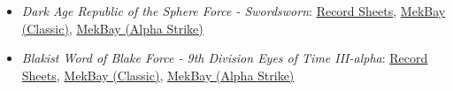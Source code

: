 \begin{itemize}
\item \emph{Dark Age Republic of the Sphere Force - Swordsworn}: \href{https://raw.githubusercontent.com/Eudicods/outworlds-wastes/rules-pdf/swordsworn.pdf}{Record Sheets}, \href{https://mekbay.com/?units=Outworlds%20Wastes~BMAtlasIII_AS7D3,BMHatchetman_HCT5DD,IMHeavyLifter_HCL1MCargoMechMOD:5:5,IMHarvester_HVR199MAAgroMechMOD:5:5,IMBurrower_DTM1MMiningMechMOD:5:5,CVTribuneMobileTacticalCommandHQ:5:5,CVJESIIIMissileCarrier,CVZiblerFastStrikeTank_A:5:5,CVZiblerFastStrikeTank_A:5:5,CVBalacStrikeVTOL_Spotter,CVFlatbedTruck_SRM:5:5,BAGrenadierIIBattleArmor_ASqd4,BAPurifierAdaptiveBattleArmor_LaserSqd4,CIMotorizedPlatoon_SRM,CIMotorizedPlatoon_SRM&name=Swordsworn&gs=cbt}{MekBay (Classic)}, \href{https://mekbay.com/?units=Outworlds%20Wastes~BMAtlasIII_AS7D3,BMHatchetman_HCT5DD,IMHeavyLifter_HCL1MCargoMechMOD:5:5,IMHarvester_HVR199MAAgroMechMOD:5:5,IMBurrower_DTM1MMiningMechMOD:5:5,CVTribuneMobileTacticalCommandHQ:5:5,CVJESIIIMissileCarrier,CVZiblerFastStrikeTank_A:5:5,CVZiblerFastStrikeTank_A:5:5,CVBalacStrikeVTOL_Spotter,CVFlatbedTruck_SRM:5:5,BAGrenadierIIBattleArmor_ASqd4,BAPurifierAdaptiveBattleArmor_LaserSqd4,CIMotorizedPlatoon_SRM,CIMotorizedPlatoon_SRM&name=Swordsworn&gs=as}{MekBay (Alpha Strike)}

\item \emph{Blakist Word of Blake Force - 9th Division Eyes of Time III-alpha}: \href{https://raw.githubusercontent.com/Eudicods/outworlds-wastes/rules-pdf/word-of-blake.pdf}{Record Sheets}, \href{https://mekbay.com/?units=Outworlds%20Wastes~BMArchangel_CANGODLuminos,BMBlueFlame_BLF21,BMMalak_CMKOCComminus,BMGurkha_GUR8G,BMMercury_MCY102,BMRedShift_RDS3A,AFStriga_SSTROBInfernus:4:4,BAPurifierAdaptiveBattleArmor_LaserSqd6:4:4,BASeirimMediumBattleArmor_Sqd6&name=9th%20Division%20Eyes%20of%20Time%20III-alpha&gs=cbt}{MekBay (Classic)}, \href{https://mekbay.com/?units=Outworlds%20Wastes~BMArchangel_CANGODLuminos,BMBlueFlame_BLF21,BMMalak_CMKOCComminus,BMGurkha_GUR8G,BMMercury_MCY102,BMRedShift_RDS3A,AFStriga_SSTROBInfernus:4:4,BAPurifierAdaptiveBattleArmor_LaserSqd6:4:4,BASeirimMediumBattleArmor_Sqd6&name=9th%20Division%20Eyes%20of%20Time%20III-alpha&gs=as}{MekBay (Alpha Strike)}


\end{itemize}
